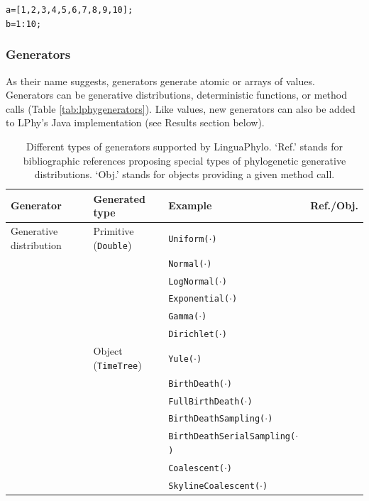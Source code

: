 \documentclass[10pt,letterpaper,table]{article}
\begin{document}
\begin{alltt}
  a = [1, 2, 3, 4, 5, 6, 7, 8, 9, 10];
  b = 1:10;
\end{alltt}

\subsubsection*{Generators}

As their name suggests, generators generate atomic or arrays of
values.
Generators can be generative distributions, deterministic functions,
or method calls (Table \ref{tab:lphygenerators}).
Like values, new generators can also be added to LPhy's Java
implementation (see Results section below).\newline

\begin{table}[h]
  \caption{Different types of generators supported by
    LinguaPhylo. `Ref.' stands for bibliographic references proposing
    special types of phylogenetic generative distributions. `Obj.'
    stands for objects providing a given method call.}
  \begin{tabular}{p{2cm}lll}
    \hline
    Generator & Generated type & Example & Ref./Obj.\\\hline
    Generative distribution & Primitive (\texttt{Double}) & \texttt{Uniform($\cdot$)} &\\
              & & \texttt{Normal($\cdot$)} &\\
              & & \texttt{LogNormal($\cdot$)} &\\
              & & \texttt{Exponential($\cdot$)} &\\
              & & \texttt{Gamma($\cdot$)} &\\
              & & \texttt{Dirichlet($\cdot$)} &\\
              & Object (\texttt{TimeTree}) & \texttt{Yule($\cdot$)} & \cite{yule1925ii}\\
              & & \texttt{BirthDeath($\cdot$)} &\\
              & & \texttt{FullBirthDeath($\cdot$)} &\\
              & & \texttt{BirthDeathSampling($\cdot$)} &\\
              & & \texttt{BirthDeathSerialSampling($\cdot$)} & \cite{stadler2013dating}\\
              & & \texttt{Coalescent($\cdot$)} & \cite{kingman82}\\
              & & \texttt{SkylineCoalescent($\cdot$)} & \cite{pybus00,drummond2005bayesiansequences}\\

\end{tabular}
\end{table}
\end{document}
